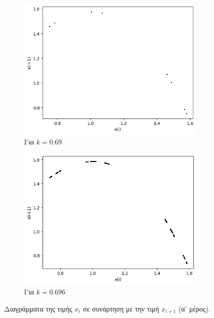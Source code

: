 \begin{figure}[ht]
\begin{subfigure}[b]{0.4\textwidth}
		\includegraphics[width=\textwidth]{LateX images/graphs q12/g7}
		\caption{Για $k=0.69$}
		\label{f:k63}
	\end{subfigure}
	\hfill
	\begin{subfigure}[b]{0.4\textwidth}
		\centering
		\includegraphics[width=\textwidth]{LateX images/graphs q12/g8}
		\caption{Για $k=0.696$}
		\label{f:k64}
	\end{subfigure}
	\hfill
	\caption{Διαγράμματα της τιμής \(x_i\) σε συνάρτηση με την τιμή \(x_{i+1}\) (α' μέρος).}
\end{figure}
